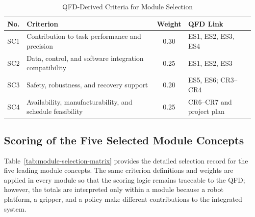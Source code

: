 \documentclass[12pt, letterpaper]{article}
\begin{document}
\begin{table}[H]
\centering
\caption{QFD-Derived Criteria for Module Selection}
\label{tab:selection-criteria}
\small
\begin{tabularx}{\textwidth}{cXcX}
\toprule
\textbf{No.} & \textbf{Criterion} & \textbf{Weight} & \textbf{QFD Link} \\
\midrule
SC1 & Contribution to task performance and precision & 0.30 & ES1, ES2, ES3, ES4 \\
SC2 & Data, control, and software integration compatibility & 0.25 & ES1, ES2, ES3 \\
SC3 & Safety, robustness, and recovery support & 0.20 & ES5, ES6; CR3--CR4 \\
SC4 & Availability, manufacturability, and schedule feasibility & 0.25 & CR6--CR7 and project plan \\
\bottomrule
\end{tabularx}
\end{table}

\subsection{Scoring of the Five Selected Module Concepts}

Table~\ref{tab:module-selection-matrix} provides the detailed selection record for the five leading module concepts. The same criterion definitions and weights are applied in every module so that the scoring logic remains traceable to the QFD; however, the totals are interpreted only within a module because a robot platform, a gripper, and a policy make different contributions to the integrated system.
\end{document}
